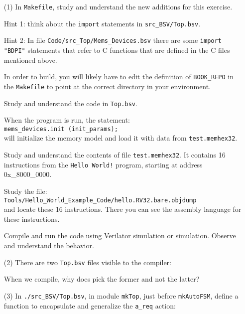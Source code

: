 \begin{itemize}

\item[(1)] In \verb|Makefile|, study and understand the new additions
    for this exercise.

    Hint 1: think about the \verb|import| statements in \verb|src_BSV/Top.bsv|.

    Hint 2: In file \verb|Code/src_Top/Mems_Devices.bsv| there are
        some \verb|import "BDPI"| statements that refer to C functions
        that are defined in the C files mentioned above.

    In order to build, you will likely have to edit the definition of
    \verb|BOOK_REPO| in the \verb|Makefile| to point at the correct
    directory in your environment.

    Study and understand the code in \verb|Top.bsv|.

    When the program is run, the statement: \\
    \hmm \verb|mems_devices.init (init_params);| \\
    will initialize the memory model and load it with data from
    \verb|test.memhex32|.

    Study and understand the contents of file \verb|test.memhex32|.
    It contains 16 instructions from the \verb|Hello World!| program,
    starting at address 0x\_8000\_0000.

    Study the file: \\
    \hmm \verb|Tools/Hello_World_Example_Code/hello.RV32.bare.objdump| \\
    and locate these 16 instructions. There you can see the assembly
    language for these instructions.

    Compile and run the code using Verilator simulation or {\BLUESIM}
    simulation.  Observe and understand the behavior.

\item[(2)] There are two \verb|Top.bsv| files visible to the {\bsc} compiler:
    When we compile, why does {\bsc} pick the former and not the latter?

\item[(3)] In \verb|./src_BSV/Top.bsv|, in module \verb|mkTop|, just
    before \verb|mkAutoFSM|, define a function to encapsulate and
    generalize the \verb|a_req| action:


\end{itemize}

